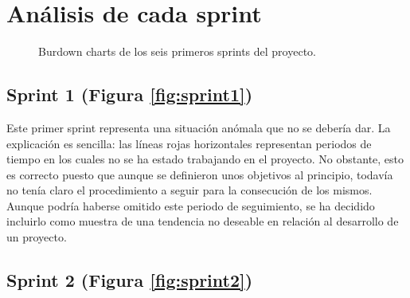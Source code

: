 \section{Análisis de cada sprint}

\begin{figure}[H]
\centering
{}\qquad
{}\qquad
{}\qquad
{}\qquad
{}\qquad
{}
\caption{Burdown charts de los seis primeros sprints del proyecto.}
\label{fig:sprints1-6}
\end{figure}

\subsection{Sprint 1 (Figura \ref{fig:sprint1})}

Este primer sprint representa una situación anómala que no se debería dar. La explicación es sencilla: las líneas rojas horizontales representan periodos de tiempo en los cuales no se ha estado trabajando en el proyecto. No obstante, esto es correcto puesto que aunque se definieron unos objetivos al principio, todavía no tenía claro el procedimiento a seguir para la consecución de los mismos. Aunque podría haberse omitido este periodo de seguimiento, se ha decidido incluirlo como muestra de una tendencia no deseable en relación al desarrollo de un proyecto.

\subsection{Sprint 2 (Figura \ref{fig:sprint2})}


